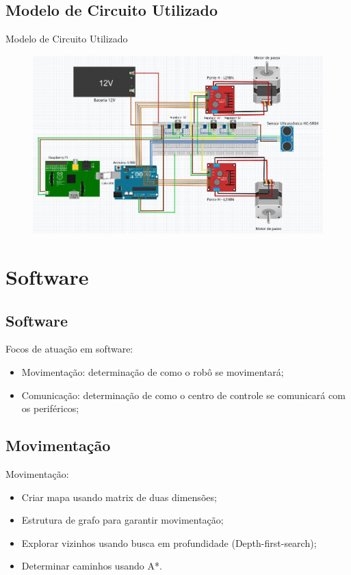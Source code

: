 \documentclass{beamer}
\begin{document}
\subsection{Modelo de Circuito Utilizado}
\begin{frame}
  Modelo de Circuito Utilizado
    \begin{figure}
    \centering
    \includegraphics[width=0.9\linewidth]{eletronica_3}
  \end{figure}
\end{frame}


\section{Software}
\subsection{Software}
\begin{frame}
  \centering
  Focos de atuação em software:
    \begin{itemize}
    \centering
        \item Movimentação: determinação de como o robô se movimentará;
        \centering
        \item Comunicação: determinação de como o centro de controle se comunicará com os periféricos;
    \end{itemize}
\end{frame}

\subsection{Movimentação}
\begin{frame}
  Movimentação:
    \begin{itemize}
        \item Criar mapa usando matrix de duas dimensões;
        \item Estrutura de grafo para garantir movimentação;
        \item Explorar vizinhos usando busca em profundidade (Depth-first-search);
        \item Determinar caminhos usando A*.
    \end{itemize}
\end{frame}
\end{document}
